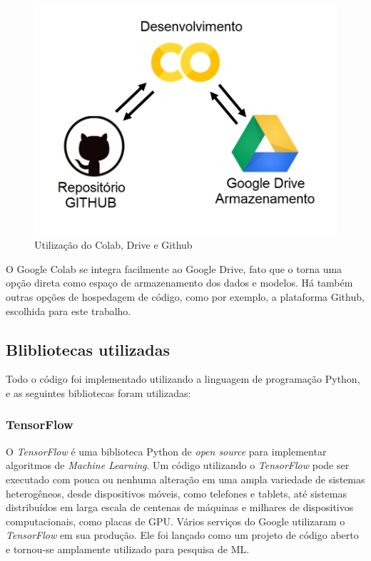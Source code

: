 \begin{figure}[H]
		\centering
		\includegraphics[scale=0.25]{figuras/MachineLearning/colabGithub.png}
		\caption{Utilização do Colab, Drive e Github}
		\label{fig:colabGithub}
\end{figure}

O Google Colab se integra facilmente ao Google Drive, fato que o torna uma opção direta como espaço de armazenamento dos dados e modelos. Há também outras opções de hospedagem de código, como por exemplo, a plataforma Github, escolhida para este trabalho.

\subsection{Blibliotecas utilizadas}

Todo o código foi implementado utilizando a linguagem de programação Python, e as seguintes bibliotecas foram utilizadas:


\subsubsection{TensorFlow}

O \textit{TensorFlow} é uma biblioteca Python de \textit{open source} para implementar algoritmos de \textit{Machine Learning}. Um código utilizando o \textit{TensorFlow} pode ser executado com pouca ou nenhuma alteração em uma ampla variedade de sistemas heterogêneos, desde dispositivos móveis, como telefones e tablets, até sistemas distribuídos em larga escala de centenas de máquinas e milhares de dispositivos computacionais, como placas de GPU. Vários serviços do Google utilizaram o \textit{TensorFlow} em sua produção. Ele foi lançado como um projeto de código aberto e tornou-se amplamente utilizado para pesquisa de ML.\cite{199317}

